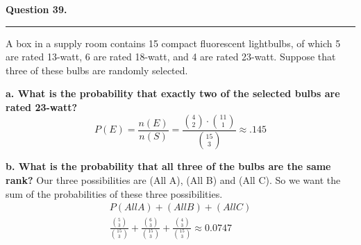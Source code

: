 \textbf{Question 39.} \\
\hrule 

A box in a supply room contains 15 compact fluorescent lightbulbs, of which 5 are rated 13-watt, 6 are rated 18-watt, and 4 are rated 23-watt. Suppose that three of these bulbs are randomly selected.

\textbf{a. What is the probability that exactly two of the selected bulbs are rated 23-watt?}
\[P(E) = \frac{n(E)}{n(S)} = \frac{\binom{4}{2} \cdot \binom{11}{1}}{\binom{15}{3}} \approx \boxed{.145}\]

\textbf{b. What is the probability that all three of the bulbs are the same rank?} \newline 
Our three possibilities are (All A), (All B) and (All C). So we want the sum of the probabilities of these three possibilities.
\begin{align*}
    P(All A) + (All B) + (All C) \\
    \frac{\binom{5}{3}}{\binom{15}{3}} + \frac{\binom{6}{3}}{\binom{15}{3}} + \frac{\binom{4}{3}}{\binom{15}{3}} \approx \boxed{0.0747} 
\end{align*}
